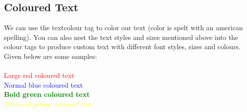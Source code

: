 \documentclass[ 12pt,a4paper,twocolumn,fleqn]{article}
\begin{document}
\subsection{Coloured Text}
We can use the textcolour tag to color our text (color is spelt with an american spelling). You can also nest the text styles and sizes mentioned above into the colour tags to produce custom text with different font styles, sizes and colours. Given below are some samples: \\
\hfill
\\
\textcolor{red}{\LARGE{Large red coloured text}} \\
\textcolor{blue}{\normalsize{Normal blue coloured text}} \\
\textcolor{green}{\normalsize{\textbf{Bold green coloured text}}} \\
\textcolor{yellow}{\normalsize{\textit{Italicized yellow coloured text}}}
\newpage
  \pagestyle{fancy}
\thisfancypage{%
  \setlength{\fboxsep}{20pt}\doublebox}{}
\twocolumn
\end{document}
